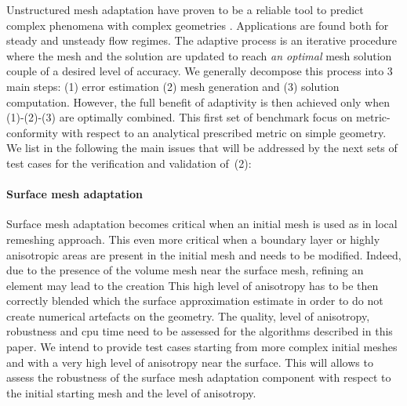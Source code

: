 \documentclass[3p,times,procedia,number]{elsarticle}
\begin{document}
Unstructured mesh adaptation have proven to be a reliable tool to predict complex phenomena  with complex geometries \cite{park-carlson-turbulent-output-adapt-aiaa,michal-krakos-aniso-adapt-edge}.
Applications are found both for steady and unsteady flow regimes. The adaptive process is an iterative procedure where  the mesh and
the solution are updated to reach {\it an optimal} mesh solution couple of a desired level of accuracy. We generally decompose this process
into 3 main steps:  (1) error estimation (2) mesh generation and (3) solution computation.
%
 However, the full benefit of adaptivity is then achieved only when (1)-(2)-(3) are optimally combined.
This first set of benchmark focus on metric-conformity with respect to an analytical prescribed
metric on simple geometry.  We list in the following the main issues that will be addressed by the next sets of test cases  for the verification and validation of~(2):

\paragraph{Surface mesh adaptation}   Surface mesh adaptation becomes critical when an initial  mesh is used as in local remeshing approach.
This even more critical when a boundary layer or highly anisotropic areas  are present in the initial mesh and needs to be modified. Indeed, due to the presence of the volume mesh near the surface mesh, refining an element may lead to the creation
This high level of anisotropy has to be then correctly blended
which the  surface approximation estimate in order to do not create numerical artefacts on the geometry.
The quality, level of anisotropy, robustness and cpu time need to be assessed  for the  algorithms described in this paper.
We intend to provide test cases  starting from more complex initial meshes and with a  very high level of anisotropy
near the surface. This will allows to assess the robustness of the surface mesh adaptation component with respect to the initial starting mesh
and the level of anisotropy.
\end{document}
